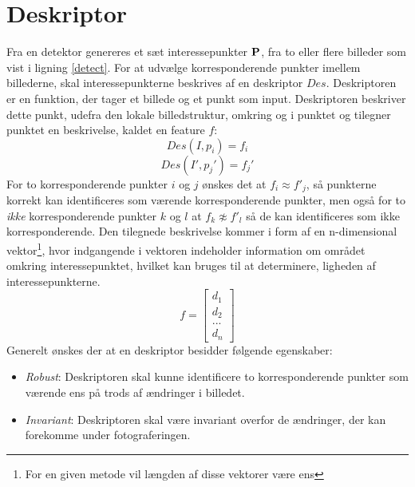 \section{Deskriptor}
Fra en detektor genereres et sæt interessepunkter $\bold{P}$, fra to eller flere billeder som vist i ligning \eqref{detect}. For at udvælge korresponderende punkter imellem billederne, skal interessepunkterne beskrives af en deskriptor $Des$. Deskriptoren er en funktion, der tager et billede og et punkt som input. Deskriptoren beskriver dette punkt, udefra den lokale billedstruktur, omkring og i punktet og tilegner punktet en beskrivelse, kaldet en feature $f$:
$$ Des(I,p_i)=f_i $$
$$ Des(I',p_j')=f_j' $$
For to korresponderende punkter $i$ og $j$ ønskes det at $f_i \approx f'_j$, så punkterne korrekt kan identificeres som værende korresponderende punkter, men også for to \textit{ikke} korresponderende punkter $k$ og $l$ at $f_k \not\approx f'_l$ så de kan identificeres som ikke korresponderende. Den tilegnede beskrivelse kommer i form af en n-dimensional vektor\footnote{For en given metode vil længden af disse vektorer være ens}, hvor indgangende i vektoren indeholder information om området omkring interessepunktet, hvilket kan bruges til at determinere, ligheden af interessepunkterne.
$$ f =
\begin{bmatrix}
d_1 \\
d_2 \\
. . . \\
d_n
\end{bmatrix}
$$
Generelt ønskes der at en deskriptor besidder følgende egenskaber:
\begin{itemize}
\item{\textit{Robust}: Deskriptoren skal kunne identificere to korresponderende punkter som værende ens på trods af ændringer i billedet.}
\item{\textit{Invariant}: Deskriptoren skal være invariant overfor de ændringer, der kan forekomme under fotograferingen.}
\end{itemize}

